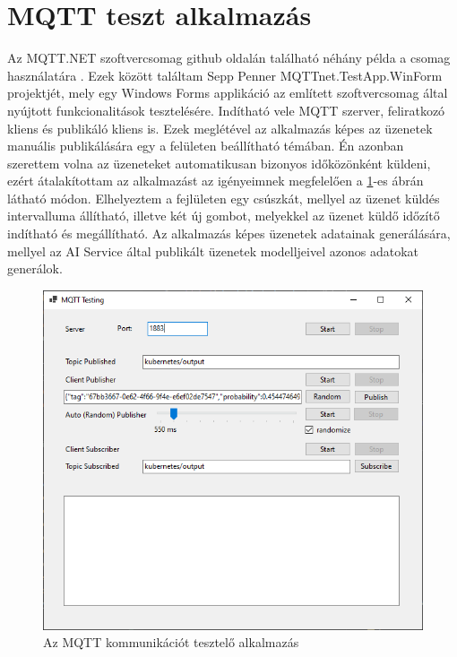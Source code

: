 \section{MQTT teszt alkalmazás}
Az MQTT.NET szoftvercsomag github oldalán található néhány példa a csomag használatára \cite{mqttnet-examples}.
Ezek között találtam Sepp Penner MQTTnet.TestApp.WinForm \cite{mqttnet-winforms} projektjét, 
mely egy Windows Forms applikáció az említett szoftvercsomag által nyújtott funkcionalitások tesztelésére.
Indítható vele MQTT szerver, feliratkozó kliens és publikáló kliens is.
Ezek meglétével az alkalmazás képes az üzenetek manuális publikálására egy a felületen beállítható témában.
Én azonban szerettem volna az üzeneteket automatikusan bizonyos időközönként küldeni,
ezért átalakítottam az alkalmazást az igényeimnek megfelelően a \ref{fig:mqtt-tester}-es ábrán látható módon.
Elhelyeztem a fejlületen egy csúszkát, mellyel az üzenet küldés intervalluma állítható, illetve két új gombot,
melyekkel az üzenet küldő időzítő indítható és megállítható.
Az alkalmazás képes üzenetek adatainak generálására, mellyel az AI Service által publikált üzenetek modelljeivel azonos adatokat generálok.
\begin{figure}[!ht]
    \centering
    \includegraphics[width=150mm, keepaspectratio]{figures/MQTT-Tester.png}
    \caption{Az MQTT kommunikációt tesztelő alkalmazás}
    \label{fig:mqtt-tester}
\end{figure}